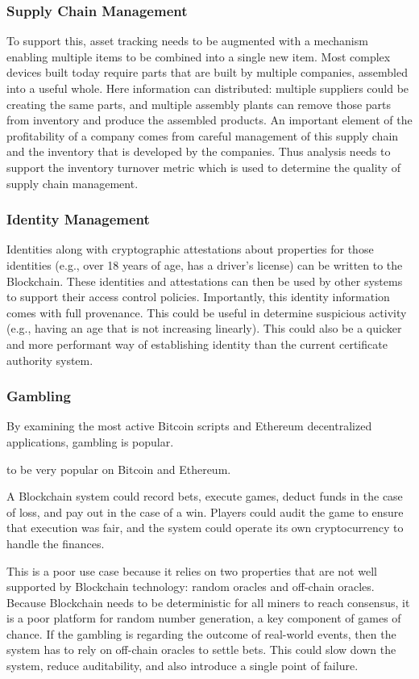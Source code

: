 \subsubsection{Supply Chain Management}
To support this, asset tracking needs to be augmented with a mechanism enabling multiple items to be combined into a single new item.  Most complex devices built today require parts that are built by multiple companies, assembled into a useful whole. Here information can distributed: multiple suppliers could be creating the same parts, and multiple assembly plants can remove those parts from inventory and produce the assembled products.  An important element of the profitability of a company comes from careful management of this supply chain and the inventory that is developed by the companies.  Thus analysis needs to support the inventory turnover metric which is used to determine the quality of supply chain management.

\subsubsection{Identity Management}
Identities along with cryptographic attestations about properties for those identities (e.g., over 18 years of age, has a driver's license) can be written to the Blockchain.
These identities and attestations can then be used by other systems to support their access control policies.
Importantly, this identity information comes with full provenance. This could be useful in determine suspicious activity (e.g., having an age that is not increasing linearly).
This could also be a quicker and more performant way of establishing identity than the current certificate authority system.

\subsubsection{Gambling}
By examining the most active Bitcoin scripts and Ethereum decentralized applications, gambling is popular. 

 to be very popular on Bitcoin and Ethereum. 
 
A Blockchain system could record bets, execute games, deduct funds in the case of loss, and pay out in the case of a win.
Players could audit the game to ensure that execution was fair, and the system could operate its own cryptocurrency to handle the finances.

This is a poor use case because it relies on two properties that are not well supported by Blockchain technology: random oracles and off-chain oracles.
Because Blockchain needs to be deterministic for all miners to reach consensus, it is a poor platform for random number generation, a key component of games of chance.
If the gambling is regarding the outcome of real-world events, then the system has to rely on off-chain oracles to settle bets. This could slow down the system, reduce auditability, and also introduce a single point of failure.


